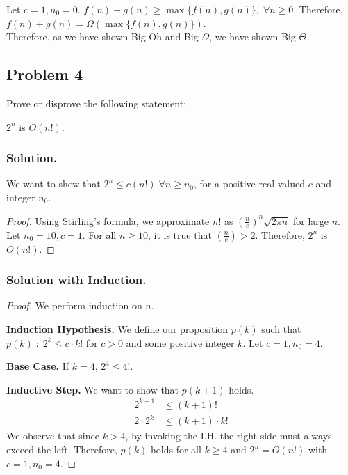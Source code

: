Let $c = 1, n_0 = 0$. $f(n) + g(n) \geq \max\{f(n), g(n)\},\;\forall n \geq 0$. Therefore, $f(n) + g(n) = \Omega(\max\{f(n), g(n)\})$.\\

Therefore, as we have shown Big-Oh and Big-$\Omega$, we have shown Big-$\Theta$.

\subsection*{Problem 4}
Prove or disprove the following statement:
\begin{center}
    $2^n$ is $O(n!)$.
\end{center}

\subsubsection*{Solution.}

We want to show that $2^n \leq c(n!)\; \forall n \geq n_0$, for a positive real-valued $c$ and integer $n_0$.\\

\begin{proof}

Using Stirling's formula, we approximate $n!$ as $(\frac{n}{e})^n \sqrt{2\pi n}$ for large $n$. Let $n_0 = 10, c = 1$. For all $n \geq 10$, it is true that $(\frac{n}{e}) > 2$. Therefore, $2^n$ is $O(n!)$.

\end{proof}

\subsubsection*{Solution with Induction.}

\begin{proof}

We perform induction on $n$.

\textbf{Induction Hypothesis.} We define our proposition $p(k)$ such that $p(k)\;:\;2^k \leq c\cdot k!$ for $c > 0$ and some positive integer $k$. Let $c = 1, n_0 = 4$.

\textbf{Base Case.} If $k = 4$, $2^4 \leq 4!$.

\textbf{Inductive Step.} We want to show that $p(k+1)$ holds.
\begin{align*}
    2^{k+1} &\leq (k+1)!\\
    2\cdot2^{k}&\leq (k+1)\cdot k!
\end{align*}
We observe that since $k > 4$, by invoking the I.H. the right side must always exceed the left. Therefore, $p(k)$ holds for all $k \geq 4$ and $2^n = O(n!)$ with $c = 1, n_0 = 4$.

\end{proof}

